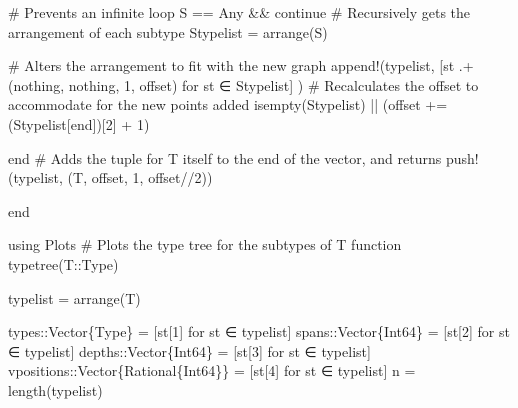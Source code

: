\documentclass[
  letterpaper,
  DIV=11,
  numbers=noendperiod]{scrreprt}
\newenvironment{Shaded}{\begin{snugshade}}{\end{snugshade}}
\newcommand{\BuiltInTok}[1]{\textcolor[rgb]{0.00,0.23,0.31}{#1}}
\newcommand{\CommentTok}[1]{\textcolor[rgb]{0.37,0.37,0.37}{#1}}
\newcommand{\ConstantTok}[1]{\textcolor[rgb]{0.56,0.35,0.01}{#1}}
\newcommand{\ControlFlowTok}[1]{\textcolor[rgb]{0.00,0.23,0.31}{#1}}
\newcommand{\DataTypeTok}[1]{\textcolor[rgb]{0.68,0.00,0.00}{#1}}
\newcommand{\FloatTok}[1]{\textcolor[rgb]{0.68,0.00,0.00}{#1}}
\newcommand{\FunctionTok}[1]{\textcolor[rgb]{0.28,0.35,0.67}{#1}}
\newcommand{\ImportTok}[1]{\textcolor[rgb]{0.00,0.46,0.62}{#1}}
\newcommand{\KeywordTok}[1]{\textcolor[rgb]{0.00,0.23,0.31}{#1}}
\newcommand{\NormalTok}[1]{\textcolor[rgb]{0.00,0.23,0.31}{#1}}
\newcommand{\OperatorTok}[1]{\textcolor[rgb]{0.37,0.37,0.37}{#1}}
\begin{document}
\begin{Shaded}
\begin{Highlighting}[]
        \CommentTok{\# Prevents an infinite loop}
\NormalTok{        S }\OperatorTok{==} \DataTypeTok{Any} \OperatorTok{\&\&} \ControlFlowTok{continue}
        \CommentTok{\# Recursively gets the arrangement of each subtype}
\NormalTok{        Stypelist }\OperatorTok{=} \FunctionTok{arrange}\NormalTok{(S)}

        \CommentTok{\# Alters the arrangement to fit with the new graph}
        \FunctionTok{append!}\NormalTok{(typelist,}
\NormalTok{            [st }\OperatorTok{.+}\NormalTok{ (}\ConstantTok{nothing}\NormalTok{, }\ConstantTok{nothing}\NormalTok{, }\FloatTok{1}\NormalTok{, offset) for st }\OperatorTok{∈}\NormalTok{ Stypelist]}
\NormalTok{        )}
        \CommentTok{\# Recalculates the offset to accommodate for the new points added}
        \FunctionTok{isempty}\NormalTok{(Stypelist) }\OperatorTok{||}\NormalTok{ (offset }\OperatorTok{+=}\NormalTok{ (Stypelist[}\KeywordTok{end}\NormalTok{])[}\FloatTok{2}\NormalTok{] }\OperatorTok{+} \FloatTok{1}\NormalTok{)}
        
    \ControlFlowTok{end}
    \CommentTok{\# Adds the tuple for T itself to the end of the vector, and returns}
    \FunctionTok{push!}\NormalTok{(typelist, (T, offset, }\FloatTok{1}\NormalTok{, offset}\OperatorTok{//}\FloatTok{2}\NormalTok{))}
    
\KeywordTok{end}

\ImportTok{using} \BuiltInTok{Plots}
\CommentTok{\# Plots the type tree for the subtypes of T}
\KeywordTok{function} \FunctionTok{typetree}\NormalTok{(T}\OperatorTok{::}\DataTypeTok{Type}\NormalTok{)}

\NormalTok{    typelist }\OperatorTok{=} \FunctionTok{arrange}\NormalTok{(T)}

\NormalTok{    types}\OperatorTok{::}\DataTypeTok{Vector\{Type\}                 }\OperatorTok{=}\NormalTok{ [st[}\FloatTok{1}\NormalTok{] for st }\OperatorTok{∈}\NormalTok{ typelist]}
\NormalTok{    spans}\OperatorTok{::}\DataTypeTok{Vector\{Int64\}                }\OperatorTok{=}\NormalTok{ [st[}\FloatTok{2}\NormalTok{] for st }\OperatorTok{∈}\NormalTok{ typelist]}
\NormalTok{    depths}\OperatorTok{::}\DataTypeTok{Vector\{Int64\}               }\OperatorTok{=}\NormalTok{ [st[}\FloatTok{3}\NormalTok{] for st }\OperatorTok{∈}\NormalTok{ typelist]}
\NormalTok{    vpositions}\OperatorTok{::}\DataTypeTok{Vector\{Rational\{Int64\}\} }\OperatorTok{=}\NormalTok{ [st[}\FloatTok{4}\NormalTok{] for st }\OperatorTok{∈}\NormalTok{ typelist]}
\NormalTok{    n }\OperatorTok{=} \FunctionTok{length}\NormalTok{(typelist)}


\end{Highlighting}
\end{Shaded}
\end{document}
